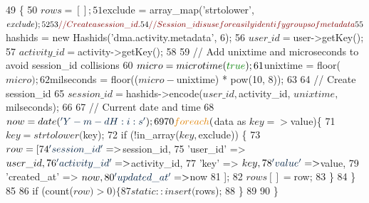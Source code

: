 \begin{DoxyCode}
49     \{
50         $rows = [];
51         $exclude = array\_map(\textcolor{stringliteral}{'strtolower'}, $exclude);
52         
53         \textcolor{comment}{// Create a session\_id.}
54         \textcolor{comment}{// Session\_id is use for easily identify groups of metadata }
55         $hashids = \textcolor{keyword}{new} Hashids(\textcolor{stringliteral}{'dma.activity.metadata'}, 6);
56         $user\_id        = $user->getKey();
57         $activity\_id    = $activity->getKey();
58         
59         \textcolor{comment}{// Add unixtime and microseconds to avoid session\_id collisions }
60         $micro       = microtime(\textcolor{keyword}{true});
61         $unixtime    = floor($micro);
62         $milseconds  = floor(($micro - $unixtime) * pow(10, 8)); 
63         
64         \textcolor{comment}{// Create session\_id}
65         $session\_id     = $hashids->encode($user\_id, $activity\_id, $unixtime, $milseconds);
66         
67         \textcolor{comment}{// Current date and time}
68         $now            = date(\textcolor{stringliteral}{'Y-m-d H:i:s'});
69         
70         \textcolor{keywordflow}{foreach}($data as $key => $value)\{
71             $key = strtolower($key);
72             \textcolor{keywordflow}{if} (!in\_array($key, $exclude)) \{
73                 $row = [
74                     \textcolor{stringliteral}{'session\_id'}    =>  $session\_id,
75                     \textcolor{stringliteral}{'user\_id'}       =>  $user\_id,
76                     \textcolor{stringliteral}{'activity\_id'}   =>  $activity\_id,
77                     \textcolor{stringliteral}{'key'}           =>  $key,
78                     \textcolor{stringliteral}{'value'}         =>  $value,
79                     \textcolor{stringliteral}{'created\_at'}    =>  $now,
80                     \textcolor{stringliteral}{'updated\_at'}    =>  $now
81                 ];
82                 $rows[] = $row;
83             \}
84         \}
85 
86         \textcolor{keywordflow}{if} (count($row) > 0)\{
87             static::insert($rows);
88         \}
89         
90     \}
\end{DoxyCode}
\hypertarget{classDMA_1_1Friends_1_1Models_1_1ActivityMetadata_a93dc8a8c1ebf8bbe7f56e665751597ab}{}
